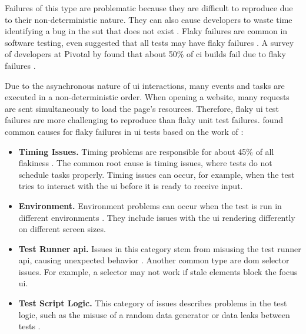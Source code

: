 Failures of this type are problematic because they are difficult to reproduce due to their non-deterministic nature.
They can also cause developers to waste time identifying a bug in the \ac{sut} that does not exist \autocite{ziftci_-flake_2020}.
Flaky failures are common in software testing, \citeauthor*{harman_start-ups_2018} even suggested that all tests may have flaky failures \autocite{harman_start-ups_2018}.
A survey of developers at Pivotal by \citeauthor*{hilton_trade-offs_2017} found that about 50\% of \ac{ci} builds fail due to flaky failures \autocite{hilton_trade-offs_2017}.

Due to the asynchronous nature of \ac{ui} interactions, many events and tasks are executed in a non-deterministic order.
When opening a website, many requests are sent simultaneously to load the page's resources.
Therefore, flaky \ac{ui} test failures are more challenging to reproduce than flaky unit test failures.
 found common causes for flaky failures in \ac{ui} tests based on the work of \citeauthor*{luo_empirical_2014} \autocite{luo_empirical_2014,romano_empirical_2021}:

\begin{itemize}
	\item \textbf{Timing Issues.} Timing problems are responsible for about 45\% of all flakiness \autocite{romano_empirical_2021}.
	      The common root cause is timing issues, where tests do not schedule tasks properly.
	      Timing issues can occur, for example, when the test tries to interact with the \ac{ui} before it is ready to receive input.
	\item \textbf{Environment.} Environment problems can occur when the test is run in different environments \autocite{romano_empirical_2021}.
	      They include issues with the \ac{ui} rendering differently on different screen sizes.
	\item \textbf{Test Runner \acs{api}.} Issues in this category stem from misusing the test runner \ac{api}, causing unexpected behavior \autocite{romano_empirical_2021}.
	      Another common type are \ac{dom} selector issues.
	      For example, a selector may not work if stale elements block the focus \ac{ui}.
	\item \textbf{Test Script Logic.} This category of issues describes problems in the test logic, such as the misuse of a random data generator or data leaks between tests \autocite{romano_empirical_2021}.
\end{itemize}

